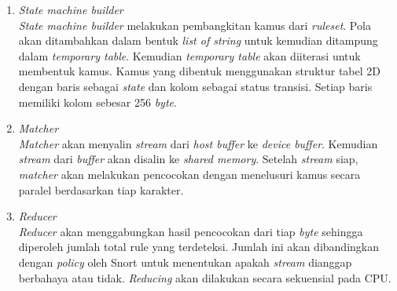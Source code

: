       \begin{enumerate}

        \item 
        \emph{State machine builder} \\
        \emph{State machine builder} melakukan pembangkitan kamus dari \emph{ruleset}. Pola akan ditambahkan dalam bentuk \emph{list of string} untuk kemudian ditampung dalam \emph{temporary table}. Kemudian \emph{temporary table} akan diiterasi untuk membentuk kamus. Kamus yang dibentuk menggunakan struktur tabel 2D dengan baris sebagai \emph{state} dan kolom sebagai status transisi. Setiap baris memiliki kolom sebesar 256 \emph{byte}.

        \item
        \emph{Matcher} \\
        \emph{Matcher} akan menyalin \emph{stream} dari \emph{host buffer} ke \emph{device buffer}. Kemudian \emph{stream} dari \emph{buffer} akan disalin ke \emph{shared memory}. Setelah \emph{stream} siap, \emph{matcher} akan melakukan pencocokan dengan menelusuri kamus secara paralel berdasarkan tiap karakter.

        \item
        \emph{Reducer} \\
        \emph{Reducer} akan menggabungkan hasil pencocokan dari tiap \emph{byte} sehingga diperoleh jumlah total rule yang terdeteksi. Jumlah ini akan dibandingkan dengan \emph{policy} oleh Snort untuk menentukan apakah \emph{stream} dianggap berbahaya atau tidak. \emph{Reducing} akan dilakukan secara sekuensial pada CPU.
        
      \end{enumerate}